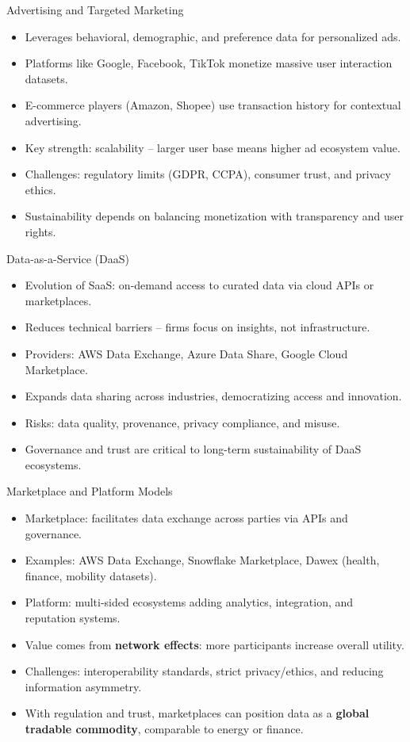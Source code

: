 \documentclass[aspectratio=169, table]{beamer}
\begin{document}
	\begin{frame}{Advertising and Targeted Marketing}
		\begin{itemize}
			\item Leverages behavioral, demographic, and preference data for personalized ads.  
			\item Platforms like Google, Facebook, TikTok monetize massive user interaction datasets.  
			\item E-commerce players (Amazon, Shopee) use transaction history for contextual advertising.  
			\item Key strength: scalability – larger user base means higher ad ecosystem value.  
			\item Challenges: regulatory limits (GDPR, CCPA), consumer trust, and privacy ethics.  
			\item Sustainability depends on balancing monetization with transparency and user rights.  
		\end{itemize}
	\end{frame}
	
	\begin{frame}{Data-as-a-Service (DaaS)}
		\begin{itemize}
			\item Evolution of SaaS: on-demand access to curated data via cloud APIs or marketplaces.  
			\item Reduces technical barriers – firms focus on insights, not infrastructure.  
			\item Providers: AWS Data Exchange, Azure Data Share, Google Cloud Marketplace.  
			\item Expands data sharing across industries, democratizing access and innovation.  
			\item Risks: data quality, provenance, privacy compliance, and misuse.  
			\item Governance and trust are critical to long-term sustainability of DaaS ecosystems.  
		\end{itemize}
	\end{frame}

\begin{frame}{Marketplace and Platform Models}
	\vspace{20pt}
	\begin{itemize}
		\item Marketplace: facilitates data exchange across parties via APIs and governance.  
		\item Examples: AWS Data Exchange, Snowflake Marketplace, Dawex (health, finance, mobility datasets).  
		\item Platform: multi-sided ecosystems adding analytics, integration, and reputation systems.  
		\item Value comes from \textbf{network effects}: more participants increase overall utility.  
		\item Challenges: interoperability standards, strict privacy/ethics, and reducing information asymmetry.  
		\item With regulation and trust, marketplaces can position data as a \textbf{global tradable commodity}, comparable to energy or finance.  
	\end{itemize}
\end{frame}
\end{document}
